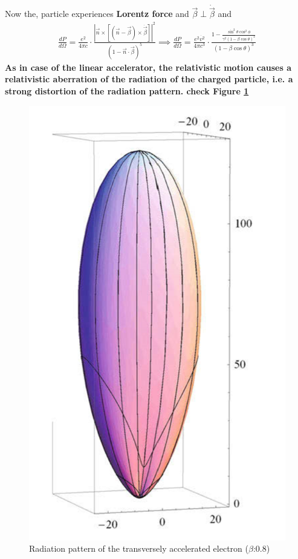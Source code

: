 \documentclass[12pt]{report}
\newcommand{\de}[2]{\frac{d{#1}}{d{#2}}}
\newcommand{\rr}[1]{\left[{#1}\right]}
\newcommand{\vd}[1]{\dot{\vec{#1}}}
\begin{document}
 Now the, particle experiences \textbf{Lorentz force} and $\vec{\beta} \perp \vd{\beta}$ and 
\begin{eqnarray}
\de{P}{\Omega}=\frac{e^2}{4 \pi c} \cdot \frac{|\vec{n}\times \rr{(\vec{n}-\vec{\beta})\times\dot{\vec{\beta}}}|^2}{(1- \vec{n}\cdot \vec{\beta})^5}
\implies \de{P}{\Omega}=\frac{e^2 \dot{v^2}}{4 \pi c^3} \cdot \frac{1-\frac{\sin^2 \theta \cos^2 \phi }{\gamma^2(1-\beta \cos \theta)^2}}{(1-\beta \cos \theta)^3}
\end{eqnarray}
\textbf{As in case of the linear accelerator, the relativistic motion causes a relativistic aberration of the radiation of the charged particle, i.e. a strong distortion of the radiation pattern. check Figure \ref{figtracpa}}
\begin{figure}[h!]\label{figtracpa}
\includegraphics[scale=1]{figtracpa.png}
\caption{Radiation pattern of the transversely accelerated electron ($\beta$:0.8)}
\end{figure}
\end{document}
